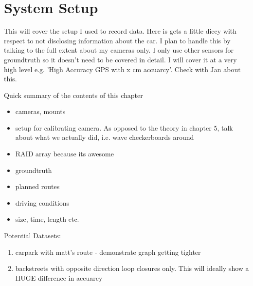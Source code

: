 \chapter{System Setup}
\label{chapter:system_setup}

This will cover the setup I used to record data.  Here is gets a little dicey with respect to not
disclosing information about the car.  I plan to handle this by talking to the full extent about my
cameras only.  I only use other sensors for groundtruth so it doesn't need to be covered in
detail.  I will cover it at a very high level e.g. 'High Accuracy GPS with x cm accuarcy'.  Check
with Jan about this.

Quick summary of the contents of this chapter

\begin{itemize}
 \item cameras, mounts
 \item setup for calibrating camera.  As opposed to the theory in chapter 5, talk about what we
actually did, i.e. wave checkerboards around
 \item RAID array because its awesome
 \item groundtruth 
 \item planned routes
 \item driving conditions
 \item size, time, length etc.
\end{itemize}

Potential Datasets:
\begin{enumerate}
 \item carpark with matt's route - demonstrate graph getting tighter
 \item backstreets with opposite direction loop closures only.  This will ideally show a HUGE
difference in accuarcy
\end{enumerate}


